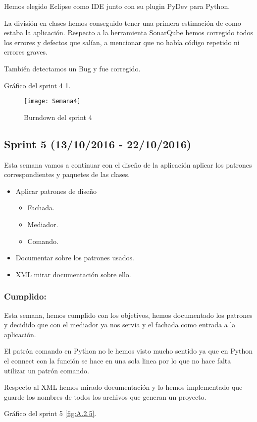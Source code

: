 Hemos elegido Eclipse como IDE junto con su plugin PyDev para Python.

La división en clases hemos conseguido tener una primera estimación de como estaba la aplicación.
Respecto a la herramienta SonarQube hemos corregido todos los errores y defectos que salían, a mencionar que no había código repetido ni errores graves.

También detectamos un Bug y fue corregido.

Gráfico del sprint 4 \ref{fig:A.2.4}.
\begin{figure}[h]
\centering
\texttt{[image: Semana4]}
\caption{Burndown del sprint 4}
\label{fig:A.2.4}
\end{figure}

\subsection{Sprint 5 (13/10/2016 - 22/10/2016)}
Esta semana vamos a continuar con el diseño de la aplicación aplicar los patrones correspondientes y paquetes de las clases.

\begin{itemize}
	\item Aplicar patrones de diseño
	\begin{itemize}
		\item Fachada.
		\item Mediador.
		\item Comando.
	\end{itemize}
	\item Documentar sobre los patrones usados.
	\item XML mirar documentación sobre ello.
\end{itemize}
\subsubsection{Cumplido:}
Esta semana, hemos cumplido con los objetivos, hemos documentado los patrones y decidido que con el mediador ya nos servia y el fachada como entrada a la aplicación.
 
El patrón comando en Python no le hemos visto mucho sentido ya que en Python el connect con la función se hace en una sola linea por lo que no hace falta utilizar un patrón comando.

Respecto al XML hemos mirado documentación y lo hemos implementado que guarde los nombres de todos los archivos que generan un proyecto.

Gráfico del sprint 5 \ref{fig:A.2.5}.

